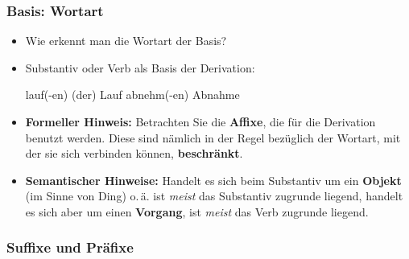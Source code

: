 \begin{frame}
\frametitle{Basis: Wortart}

\begin{itemize}
	\item Wie erkennt man die Wortart der Basis?
	
		\item Substantiv oder Verb als Basis der Derivation:
		
		\eal 
			\ex lauf(-en) \ras (der) Lauf
			\ex abnehm(-en) \ras Abnahme
		\zl


		\item \textbf{Formeller Hinweis:} Betrachten Sie die \textbf{Affixe}, die für die Derivation benutzt werden. Diese sind nämlich in der Regel bezüglich der Wortart, mit der sie sich verbinden können, \textbf{beschränkt}.
		
\medskip
				
		\item \textbf{Semantischer Hinweise:} Handelt es sich beim Substantiv um ein \textbf{Objekt} (im Sinne von Ding) o.\,ä. ist \emph{meist} das Substantiv zugrunde liegend, handelt es sich aber um einen \textbf{Vorgang}, ist \emph{meist} das Verb zugrunde liegend.
		
%	
\end{itemize}

\end{frame}


\subsubsection{Suffixe und Präfixe}


